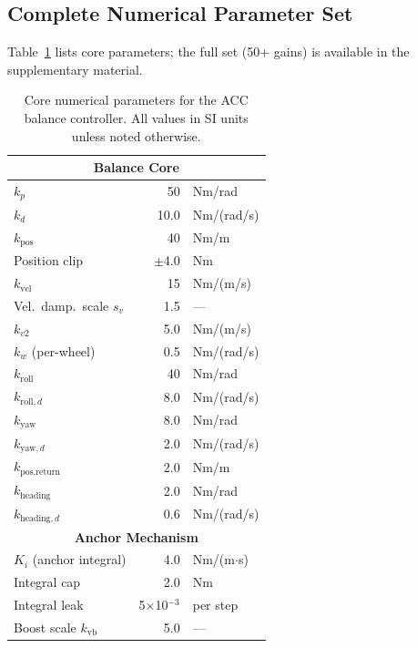 \documentclass[conference]{IEEEtran}
\begin{document}
\subsection{Complete Numerical Parameter Set}
\label{sec:parameters}

Table~\ref{tab:parameters} lists core parameters; the full set (50+ gains) is available in the supplementary material.

\begin{table}[t]
\centering
\footnotesize
\caption{Core numerical parameters for the ACC balance controller. All values in SI units unless noted otherwise.}
\label{tab:parameters}
\begin{tabular}{@{}p{2.8cm}rp{1.8cm}@{}}
\toprule
\multicolumn{3}{c}{\textbf{Balance Core}} \\
\midrule
$k_p$                      & 50      & Nm/rad \\
$k_d$                      & 10.0    & Nm/(rad/s) \\
$k_{\text{pos}}$           & 40      & Nm/m \\
Position clip              & $\pm$4.0 & Nm \\
$k_{\text{vel}}$           & 15      & Nm/(m/s) \\
Vel.\ damp.\ scale $s_v$   & 1.5     & --- \\
$k_{v2}$                   & 5.0     & Nm/(m/s) \\
$k_w$ (per-wheel)          & 0.5     & Nm/(rad/s) \\
$k_{\text{roll}}$          & 40      & Nm/rad \\
$k_{\text{roll},d}$        & 8.0     & Nm/(rad/s) \\
$k_{\text{yaw}}$           & 8.0     & Nm/rad \\
$k_{\text{yaw},d}$         & 2.0     & Nm/(rad/s) \\
$k_{\text{pos,return}}$    & 2.0     & Nm/m \\
$k_{\text{heading}}$       & 2.0     & Nm/rad \\
$k_{\text{heading},d}$     & 0.6     & Nm/(rad/s) \\
\midrule
\multicolumn{3}{c}{\textbf{Anchor Mechanism}} \\
\midrule
$K_i$ (anchor integral)    & 4.0     & Nm/(m$\cdot$s) \\
Integral cap               & 2.0     & Nm \\
Integral leak              & 5$\times$10$^{-3}$ & per step \\
Boost scale $k_{\text{vb}}$& 5.0     & --- \\

\end{tabular}
\end{table}
\end{document}
